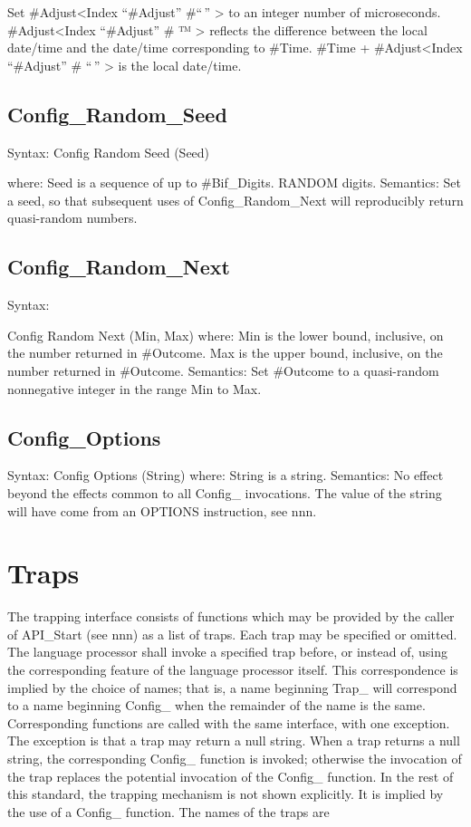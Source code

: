 Set \#Adjust\textless Index ``\#Adjust'' \#``\,'' \textgreater{} to an
integer number of microseconds. \#Adjust\textless Index ``\#Adjust'' \#
™ \textgreater{} reflects the difference between the local date/time and
the date/time corresponding to \#Time. \#Time + \#Adjust\textless Index
``\#Adjust'' \# ``\,'' \textgreater{} is the local date/time.

\subsection{Config\_Random\_Seed}\label{config_random_seed}

Syntax: Config Random Seed (Seed)

where: Seed is a sequence of up to \#Bif\_Digits. RANDOM digits.
Semantics: Set a seed, so that subsequent uses of Config\_Random\_Next
will reproducibly return quasi-random numbers.

\subsection{Config\_Random\_Next}\label{config_random_next}

Syntax:

Config Random Next (Min, Max) where: Min is the lower bound, inclusive,
on the number returned in \#Outcome. Max is the upper bound, inclusive,
on the number returned in \#Outcome. Semantics: Set \#Outcome to a
quasi-random nonnegative integer in the range Min to Max.

\subsection{Config\_Options}\label{config_options}

Syntax: Config Options (String) where: String is a string. Semantics: No
effect beyond the effects common to all Config\_ invocations. The value
of the string will have come from an OPTIONS instruction, see nnn.

\section{Traps}\label{traps}

The trapping interface consists of functions which may be provided by
the caller of API\_Start (see nnn) as a list of traps. Each trap may be
specified or omitted. The language processor shall invoke a specified
trap before, or instead of, using the corresponding feature of the
language processor itself. This correspondence is implied by the choice
of names; that is, a name beginning Trap\_ will correspond to a name
beginning Config\_ when the remainder of the name is the same.
Corresponding functions are called with the same interface, with one
exception. The exception is that a trap may return a null string. When a
trap returns a null string, the corresponding Config\_ function is
invoked; otherwise the invocation of the trap replaces the potential
invocation of the Config\_ function. In the rest of this standard, the
trapping mechanism is not shown explicitly. It is implied by the use of
a Config\_ function. The names of the traps are

